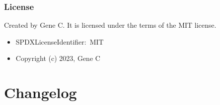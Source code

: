 \documentclass[letterpaper,10pt,english]{sphinxmanual}
\begin{document}
\subsection{License}
\label{\detokenize{Readme-TLS:license}}
\sphinxAtStartPar
Created by Gene C. It is licensed under the terms of the MIT license.
\begin{itemize}
\item {} 
\sphinxAtStartPar
SPDX\sphinxhyphen{}License\sphinxhyphen{}Identifier: MIT

\item {} 
\sphinxAtStartPar
Copyright (c) 2023, Gene C

\end{itemize}

\sphinxstepscope


\chapter{Changelog}
\label{\detokenize{Changelog:changelog}}\label{\detokenize{Changelog::doc}}
\sphinxAtStartPar
{}

\begin{sphinxVerbatim}[commandchars=\\\{\}]
       
 
\end{sphinxVerbatim}

\sphinxAtStartPar
{}

\begin{sphinxVerbatim}[commandchars=\\\{\}]
   
 
\end{sphinxVerbatim}

\sphinxAtStartPar
{}

\begin{sphinxVerbatim}[commandchars=\\\{\}]
 
\end{sphinxVerbatim}

\sphinxAtStartPar
{}
\end{document}
